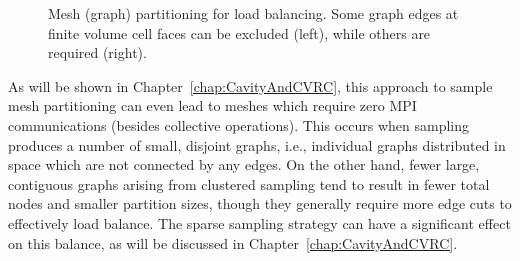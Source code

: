 \begin{figure}
\begin{minipage}{0.45\linewidth}
    \end{minipage}
    \caption{\label{fig:edgeCuts}Mesh (graph) partitioning for load balancing. Some graph edges at finite volume cell faces can be excluded (left), while others are required (right).}
\end{figure}

As will be shown in Chapter~\ref{chap:CavityAndCVRC}, this approach to sample mesh partitioning can even lead to meshes which require zero MPI communications (besides collective operations). This occurs when sampling produces a number of small, disjoint graphs, i.e., individual graphs distributed in space which are not connected by any edges. On the other hand, fewer large, contiguous graphs arising from clustered sampling tend to result in fewer total nodes and smaller partition sizes, though they generally require more edge cuts to effectively load balance. The sparse sampling strategy can have a significant effect on this balance, as will be discussed in Chapter~\ref{chap:CavityAndCVRC}.



